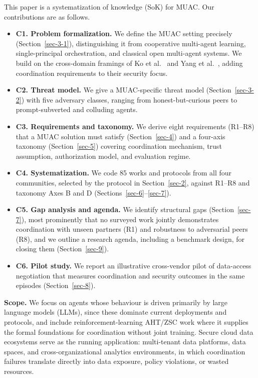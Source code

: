 \documentclass[conference]{IEEEtran}
\providecommand{\tightlist}{\setlength{\itemsep}{0pt}\setlength{\parskip}{0pt}}
\begin{document}
This paper is a systematization of knowledge (SoK) for MUAC. Our contributions are as follows.

\begin{itemize}
\tightlist
\item
  \textbf{C1. Problem formalization.} We define the MUAC setting precisely (Section~\ref{sec-3-1}), distinguishing it from cooperative multi-agent learning, single-principal orchestration, and classical open multi-agent systems. We build on the cross-domain framings of Ko et al.~\cite{ko2026sevenchallenges} and Yang et al.~\cite{yang2026soksafeagents}, adding coordination requirements to their security focus.
\item
  \textbf{C2. Threat model.} We give a MUAC-specific threat model (Section~\ref{sec-3-2}) with five adversary classes, ranging from honest-but-curious peers to prompt-subverted and colluding agents.
\item
  \textbf{C3. Requirements and taxonomy.} We derive eight requirements (R1--R8) that a MUAC solution must satisfy (Section~\ref{sec-4}) and a four-axis taxonomy (Section~\ref{sec-5}) covering coordination mechanism, trust assumption, authorization model, and evaluation regime.
\item
  \textbf{C4. Systematization.} We code 85 works and protocols from all four communities, selected by the protocol in Section~\ref{sec-2}, against R1--R8 and taxonomy Axes B and D (Sections~\ref{sec-6}--\ref{sec-7}).
\item
  \textbf{C5. Gap analysis and agenda.} We identify structural gaps (Section~\ref{sec-7}), most prominently that no surveyed work jointly demonstrates coordination with unseen partners (R1) and robustness to adversarial peers (R8), and we outline a research agenda, including a benchmark design, for closing them (Section~\ref{sec-9}).
\item
  \textbf{C6. Pilot study.} We report an illustrative cross-vendor pilot of data-access negotiation that measures coordination and security outcomes in the same episodes (Section~\ref{sec-8}).
\end{itemize}

\textbf{Scope.} We focus on agents whose behaviour is driven primarily by large language models (LLMs), since these dominate current deployments and protocols, and include reinforcement-learning AHT/ZSC work where it supplies the formal foundations for coordination without joint training. Secure cloud data ecosystems serve as the running application: multi-tenant data platforms, data spaces, and cross-organizational analytics environments, in which coordination failures translate directly into data exposure, policy violations, or wasted resources.
\end{document}
